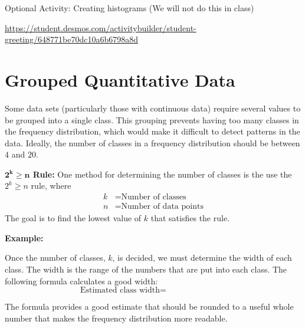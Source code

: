 \documentclass[12pt, letterpaper]{article}
\newcounter{exercise}
\theoremstyle{definition}
\begin{document}
\begin{exercise}
Optional Activity:  Creating histograms  (We will not do this in class)
\vspace*{.2in}

\href{https://student.desmos.com/activitybuilder/student-greeting/648771be70dc10a6b6798a8d}{https://student.desmos.com/activitybuilder/student-greeting/648771be70dc10a6b6798a8d}

\end{exercise}


\section*{Grouped Quantitative Data}

\begin{statement}
Some data sets (particularly those with continuous data) require several values to be grouped into a single class.  This grouping prevents having too many classes in the frequency distribution, which would make it difficult to detect patterns in the data.  Ideally, the number of classes in a frequency distribution should be between $4$ and $20$.
\vspace*{.2in}

\textbf{$\mathbf{2^k\geq n}$ Rule:}
One method for determining the number of classes is the use the $2^k\geq n$ rule, where
\begin{align*}
k &= \text{Number of classes}\\
n &= \text{Number of data points}
\end{align*}
The goal is to find the lowest value of $k$ that satisfies the rule.
\end{statement}

\textbf{Example:}

\vfill

\begin{statement}
Once the number of classes, $k$, is decided, we must determine the width of each class.  The width is the range of the numbers that are put into each class.  The following formula calculates a good width:
$$ \text{Estimated class width} = ~~~~~~~~~~~~~~~~~~~~~~~~~~~~~~~~~ $$
\vspace{.2in}

The formula provides a good estimate that should be rounded to a useful whole number that makes the frequency distribution more readable.
\end{statement}

\newpage
\end{document}
